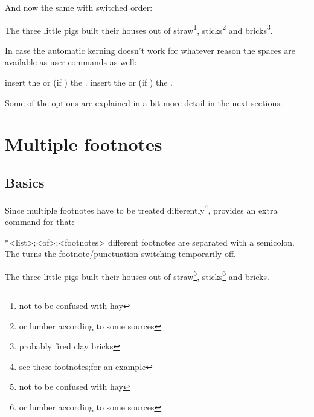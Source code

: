 \documentclass[toc=index,toc=bib]{cnpkgdoc}
\begin{document}
And now the same with switched order:
\begin{beispiel}
 \begin{minipage}{.4\linewidth}
  \noindent The three little pigs built their houses
  out of straw\footnote{not to be confused with hay},
  sticks\footnote{or lumber according to some sources}
  and bricks\footnote{probably fired clay bricks}.
 \end{minipage}
\end{beispiel}

In case the automatic kerning doesn't work for whatever reason the spaces are
available as user commands as well:
\begin{beschreibung}
  insert the  or (if )
 the .
  insert the  or (if )
 the .
\end{beschreibung}

Some of the options are explained in a bit more detail in the next sections.

\section{Multiple footnotes}\label{sec:multiple}
\subsection{Basics}
Since multiple footnotes have to be treated differently\footnote{see these footnotes;for an example},
\fnpct provides an extra command for that:
\begin{beschreibung}
 *{<list>;<of>;<footnotes>} different footnotes are separated
 with a semicolon. The \code{*} turns the footnote/punctuation switching temporarily
 off.
\end{beschreibung}
\begin{beispiel}
 \begin{minipage}{.4\linewidth}
  \noindent The three little pigs built their houses
  out of straw\footnote{not to be confused with hay},
  sticks\footnote{or lumber according to some sources}
  and bricks.
 \end{minipage}
\end{beispiel}
\end{document}
